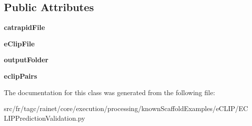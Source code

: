 \subsection*{Public Attributes}
\begin{DoxyCompactItemize}
\item 
\hypertarget{classECLIPPredictionValidation_1_1ECLIPPredictionValidation_a7d09ab57e6ffeb21545afb5a3972b43f}{{\bfseries catrapid\-File}}\label{classECLIPPredictionValidation_1_1ECLIPPredictionValidation_a7d09ab57e6ffeb21545afb5a3972b43f}

\item 
\hypertarget{classECLIPPredictionValidation_1_1ECLIPPredictionValidation_a4e79e09a3a3bef3e32f0492a054c6372}{{\bfseries e\-Clip\-File}}\label{classECLIPPredictionValidation_1_1ECLIPPredictionValidation_a4e79e09a3a3bef3e32f0492a054c6372}

\item 
\hypertarget{classECLIPPredictionValidation_1_1ECLIPPredictionValidation_a07208ba0be44716018524339ffa4a2ae}{{\bfseries output\-Folder}}\label{classECLIPPredictionValidation_1_1ECLIPPredictionValidation_a07208ba0be44716018524339ffa4a2ae}

\item 
\hypertarget{classECLIPPredictionValidation_1_1ECLIPPredictionValidation_a1f479aaee98516859304e14d5b66cc97}{{\bfseries eclip\-Pairs}}\label{classECLIPPredictionValidation_1_1ECLIPPredictionValidation_a1f479aaee98516859304e14d5b66cc97}

\end{DoxyCompactItemize}


The documentation for this class was generated from the following file\-:\begin{DoxyCompactItemize}
\item 
src/fr/tagc/rainet/core/execution/processing/known\-Scaffold\-Examples/e\-C\-L\-I\-P/E\-C\-L\-I\-P\-Prediction\-Validation.\-py\end{DoxyCompactItemize}
